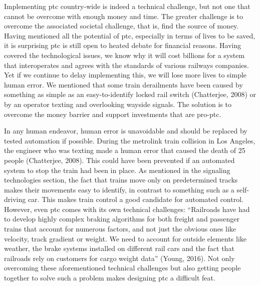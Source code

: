 \documentclass[11pt, titlepage]{article}
\begin{document}
Implementing \gls{ptc} country-wide is indeed a technical challenge, but not one
that cannot be overcome with enough money and time. The greater challenge is to
overcome the associated societal challenge, that is, find the source of money.
Having mentioned all the potential of \gls{ptc}, especially in terms of lives to
be saved, it is surprising \gls{ptc} is still open to heated debate for financial
reasons. Having covered the technological issues, we know why it will cost
billions for a system that interoperates and agrees with the standards of various
railways companies. Yet if we continue to delay implementing this, we will lose
more lives to simple human error. We mentioned that some train derailments have
been caused by something as simple as an easy-to-identify locked rail switch
(Chatterjee, 2008) or by an operator texting and overlooking wayside signals. The solution
is to overcome the money barrier and support
investments that are pro-\gls{ptc}.

In any human endeavor, human error is unavoidable and should be replaced by tested
automation if possible. During the \gls{metrolink} train collision in Los Angeles,
the engineer who was texting made a human error that caused the death of 25
people (Chatterjee, 2008). This could have been prevented if an automated system to
stop the train had been in place. As mentioned in the signaling technologies
section, the fact that trains move only on predetermined tracks makes their
movements easy to identify, in contrast to something such as a self-driving car.
This makes train control a good candidate for automated control. However, even
\gls{ptc} comes with its own technical challenges: ``Railroads have had to develop
highly complex braking algorithms for both freight and passenger trains that
account for numerous factors, and not just the obvious ones like velocity, track
gradient or weight. We need to account for outside elements like weather, the
brake systems installed on different rail cars and the fact that railroads rely on
customers for cargo weight data'' (Young, 2016). Not only overcoming these
aforementioned technical challenges but also getting people together to solve such
a problem makes designing \gls{ptc} a difficult feat.
\end{document}
